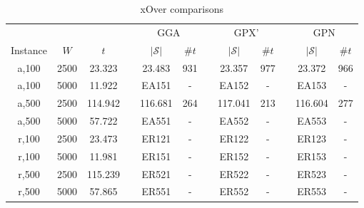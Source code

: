 \documentclass{elsarticle}
\begin{document}
\begin{table}[h!]
	\centering
	\caption{xOver comparisons}
	\begin{tabular}{cccccccccccc}\toprule
		& & & &\multicolumn{2}{c}{GGA} &\phantom{a}& \multicolumn{2}{c}{GPX'} &\phantom{a}& \multicolumn{2}{c}{GPN}\\
		\cmidrule{5-6} \cmidrule{8-9} \cmidrule{11-12}
		Instance & $W$ & $t$ && $|\mathcal{S}|$ & $\# t$ && $|\mathcal{S}|$ & $\# t$ && $|\mathcal{S}|$ & $\# t$ \\ \midrule	
		a,100 & 2500 & 23.323 && 23.483 & 931 && 23.357 & 977 && 23.372 & 966 \\
		a,100 & 5000 & 11.922 && EA151 & - && EA152 & - && EA153 & -\\
		\midrule
		a,500 & 2500 & 114.942 && 116.681 & 264 && 117.041 & 213 && 116.604 & 277 \\
		a,500 & 5000 & 57.722 && EA551 & - && EA552 & - && EA553 & -\\
		\midrule
		\midrule
		r,100 & 2500 & 23.473 && ER121 & - && ER122 & - && ER123 & -\\
		r,100 & 5000 & 11.981 && ER151 & - && ER152 & - && ER153 & -\\
		\midrule
		r,500 & 2500 & 115.239 && ER521 & - && ER522 & - && ER523 & -\\
		r,500 & 5000 & 57.865 && ER551 & - && ER552 & - && ER553 & -\\
		\bottomrule
	\end{tabular}	
	\label{table:EA}
\end{table}
\end{document}
